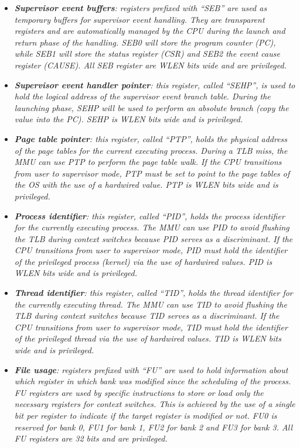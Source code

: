 \begin{itemize}
                \item \textit{\textbf{Supervisor event buffers}: registers prefixed with ``SEB'' are used as temporary buffers for supervisor event handling. They are transparent registers and are automatically managed by the CPU during the launch and return phase of the handling. SEB0 will store the program counter (PC), while SEB1 will store the status register (CSR) and SEB2 the event cause register (CAUSE). All SEB register are WLEN bits wide and are privileged.}

                \item \textit{\textbf{Supervisor event handler pointer}: this register, called ``SEHP'', is used to hold the logical address of the supervisor event branch table. During the launching phase, SEHP will be used to perform an absolute branch (copy the value into the PC). SEHP is WLEN bits wide and is privileged.}

                \item \textit{\textbf{Page table pointer}: this register, called ``PTP'', holds the physical address of the page tables for the current executing process. During a TLB miss, the MMU can use PTP to perform the page table walk. If the CPU transitions from user to supervisor mode, PTP must be set to point to the page tables of the OS with the use of a hardwired value. PTP is WLEN bits wide and is privileged.}

                \item \textit{\textbf{Process identifier}: this register, called ``PID'', holds the process identifier for the currently executing process. The MMU can use PID to avoid flushing the TLB during context switches because PID serves as a discriminant. If the CPU transitions from user to supervisor mode, PID must hold the identifier of the privileged process (kernel) via the use of hardwired values. PID is WLEN bits wide and is privileged.}

                \item \textit{\textbf{Thread identifier}: this register, called ``TID'', holds the thread identifier for the currently executing thread. The MMU can use TID to avoid flushing the TLB during context switches because TID serves as a discriminant. If the CPU transitions from user to supervisor mode, TID must hold the identifier of the privileged thread via the use of hardwired values. TID is WLEN bits wide and is privileged.}

                \item \textit{\textbf{File usage}: registers prefixed with ``FU'' are used to hold information about which register in which bank was modified since the scheduling of the process. FU registers are used by specific instructions to store or load only the necessary registers for context switches. This is achieved by the use of a single bit per register to indicate if the target register is modified or not. FU0 is reserved for bank 0, FU1 for bank 1, FU2 for bank 2 and FU3 for bank 3. All FU registers are 32 bits and are privileged.}


\end{itemize}
